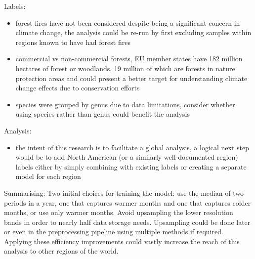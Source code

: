 Labels:
\begin{itemize}
    \item forest fires have not been considered despite being a significant concern in climate change, the analysis could be re-run by first excluding samples within regions known to have had forest fires
    \item commercial vs non-commercial forests, EU member states have 182 million hectares of forest or woodlands, 19 million of which are forests in nature protection areas and could present a better target for understanding climate change effects due to conservation efforts
    \item species were grouped by genus due to data limitations, consider whether using species rather than genus could benefit the analysis
\end{itemize}

Analysis:
\begin{itemize}
    \item the intent of this research is to facilitate a global analysis, a logical next step would be to add North American (or a similarly well-documented region) labels either by simply combining with existing labels or creating a separate model for each region
\end{itemize}


Summarising:
Two initial choices for training the model: use the median of two periods in a year, one that captures warmer months and one that captures colder months, or use only warmer months. Avoid upsampling the lower resolution bands in order to nearly half data storage needs. Upsampling could be done later or even in the preprocessing pipeline using multiple methods if required. Applying these efficiency improvements could vastly increase the reach of this analysis to other regions of the world.

